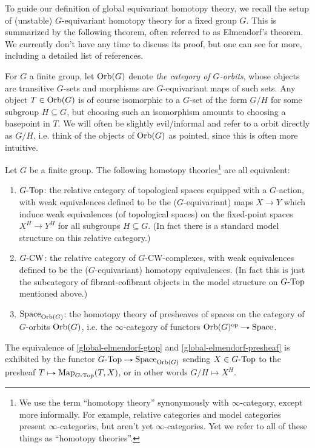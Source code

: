 To guide our definition of global equivariant homotopy theory, we
recall the setup of (unstable) $G$-equivariant homotopy theory for a
fixed group $G$. This is summarized by the following theorem, often
referred to as Elmendorf's theorem. We currently don't have any time
to discuss its proof, but one can see \cite{nlab-equivhomotopy} for
more, including a detailed list of references.

\begin{notation}
  \label{global-orbg}
  For $G$ a finite group, let $\mathrm{Orb}(G)$ denote \emph{the category of
    $G$-orbits}, whose objects are transitive $G$-sets and morphisms
  are $G$-equivariant maps of such sets. Any object $T \in \mathrm{Orb}(G)$ is
  of course isomorphic to a $G$-set of the form $G/H$ for some
  subgroup $H \subseteq G$, but choosing such an isomorphism amounts
  to choosing a basepoint in $T$. We will often be slightly
  evil/informal and refer to a orbit directly as $G/H$, i.e. think of
  the objects of $\mathrm{Orb}(G)$ as pointed, since this is often more
  intuitive.
\end{notation}

\begin{theorem}[Elmendorf]
  \label{global-elmendorf}
  Let $G$ be a finite group. The following homotopy
  theories\footnote{We use the term ``homotopy theory'' synonymously
    with $\infty$-category, except more informally. For example,
    relative categories and model categories present
    $\infty$-categories, but aren't yet $\infty$-categories. Yet we
    refer to all of these things as ``homotopy theories''.} are all
  equivalent:
  \begin{enumerate}
  \item \label{global-elmendorf-gtop} $G\text{-}\mathrm{Top}$: the relative
    category of topological spaces equipped with a $G$-action, with
    weak equivalences defined to be the ($G$-equivariant) maps
    $X \to Y$ which induce weak equivalences (of topological spaces)
    on the fixed-point spaces $X^H \to Y^H$ for all subgroups
    $H \subseteq G$. (In fact there is a standard model structure on
    this relative category.)
  \item \label{global-elmendorf-gcw} $G\text{-}\mathrm{CW}$: the relative
    category of $G$-CW-complexes, with weak equivalences defined to be
    the ($G$-equivariant) homotopy equivalences. (In fact this is just
    the subcategory of fibrant-cofibrant objects in the model
    structure on $G\text{-}\mathrm{Top}$ mentioned above.)
  \item \label{global-elmendorf-presheaf} $\mathrm{Space}_{\mathrm{Orb}(G)}$: the
    homotopy theory of presheaves of spaces on the category of
    $G$-orbits $\mathrm{Orb}(G)$, i.e. the $\infty$-category of functors
    $\Orb(G)^\op \to \Space$.
  \end{enumerate}
  The equivalence of \cref{global-elmendorf-gtop} and
  \cref{global-elmendorf-presheaf} is exhibited by the functor
  $G\dash\Top \to \Space_{\Orb(G)}$ sending $X \in G\text{-}\mathrm{Top}$ to the
  presheaf $T \mapsto \Map_{G\dash\Top}(T,X)$, or in other words
  $G/H \mapsto X^H$.
\end{theorem}


